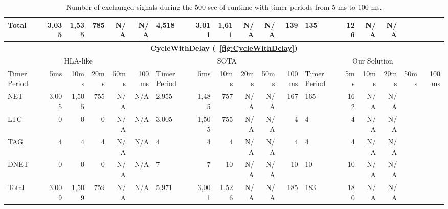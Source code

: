 \begin{table*}
\begin{tabular}{|l|rrrrr||l|rrrrr||l|rrrrr|}
		Total & 3,035 & 1,535 & 785 & N/A & N/A & 4,518 & 3,011 & 1,611 & N/A & N/A & 139 & 135 & 126 & N/A & N/A \\
		\hline
%
		\hline
		\hline
		\multicolumn{18}{|c|}{\textbf{CycleWithDelay (\figurename~\ref{fig:CycleWithDelay})}} \\
		\hline
		\multicolumn{6}{|c||}{HLA-like} & \multicolumn{6}{|c||}{SOTA} & \multicolumn{6}{|c|}{Our Solution} \\
		\hline
		Timer Period \hspace{-5pt} & 5ms & 10ms & 20ms & 50ms & 100ms & Timer Period \hspace{-5pt} & 5ms & 10ms & 20ms & 50ms & 100ms & Timer Period \hspace{-5pt} & 5ms & 10ms & 20ms & 50ms & 100ms \\
		\hline
		NET & 3,005 & 1,505 & 755 & N/A & N/A & 2,955 & 1,485 & 757 & N/A & N/A & 167 & 165 & 162 & N/A & N/A \\
		LTC & 0 & 0 & 0 & N/A & N/A & 3,005 & 1,505 & 755 & N/A & N/A & 4 & 4 & 4 & N/A & N/A \\
		TAG & 4 & 4 & 4 & N/A & N/A & 4 & 4 & 4 & N/A & N/A & 4 & 4 & 4 & N/A & N/A \\
		DNET & 0 & 0 & 0 & N/A & N/A & 7 & 7 & 10 & N/A & N/A & 10 & 10 & 10 & N/A & N/A \\
		Total & 3,009 & 1,509 & 759 & N/A & N/A & 5,971 & 3,001 & 1,526 & N/A & N/A & 185 & 183 & 180 & N/A & N/A \\
		\hline
	\end{tabular}
	
	\caption{Number of exchanged signals during the 500 sec of runtime with timer periods from 5 ms to 100 ms.}
	\label{tab:NumSignals}
\end{table*}